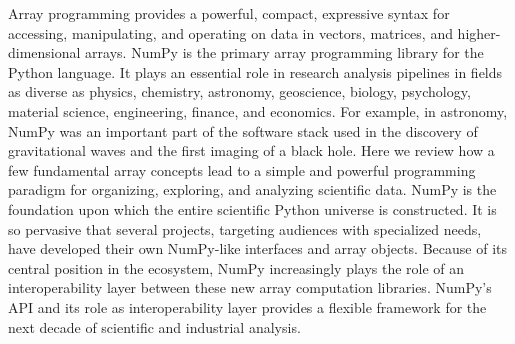 
Array programming provides a powerful, compact, expressive syntax for accessing,
manipulating, and operating on data in vectors, matrices, and
higher-dimensional arrays. %
NumPy is the primary array programming library for the Python language.
It plays an essential role in research analysis pipelines in fields as
diverse as physics, chemistry, astronomy, geoscience, biology, psychology,
material science, engineering, finance, and economics.
For example, in astronomy, NumPy was an important part of the software stack used
in the discovery of gravitational waves %
and the first imaging of a black hole. %
Here we review how a few fundamental array concepts lead to a simple and
powerful programming paradigm for organizing, exploring, and analyzing
scientific data.
NumPy is the foundation upon which the entire scientific Python
universe is constructed. It is so pervasive that several projects,
targeting audiences with specialized needs, have developed their own
NumPy-like interfaces and array objects. Because of its central position in the
ecosystem, NumPy increasingly plays the role of an interoperability layer
between these new array computation libraries.
NumPy's API and its role as interoperability layer provides a flexible
framework for the next decade of scientific and industrial analysis.
